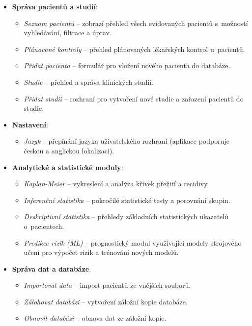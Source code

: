 \documentclass[12pt,a4paper]{article}
\begin{document}
\begin{itemize}
    \item \textbf{Správa pacientů a studií}:
    \begin{itemize}
        \item \textit{Seznam pacientů} -- zobrazí přehled všech evidovaných pacientů s~možností vyhledávání, filtrace a úprav.
        \item \textit{Plánované kontroly} -- přehled plánovaných lékařských kontrol u~pacientů.
        \item \textit{Přidat pacienta} -- formulář pro vložení nového pacienta do databáze.
        \item \textit{Studie} -- přehled a správa klinických studií.
        \item \textit{Přidat studii} -- rozhraní pro vytvoření nové studie a zařazení pacientů do studie.
    \end{itemize}
    
    \item \textbf{Nastavení}:
    \begin{itemize}
        \item \textit{Jazyk} -- přepínání jazyka uživatelského rozhraní (aplikace podporuje českou a anglickou lokalizaci).
    \end{itemize}

    \item \textbf{Analytické a statistické moduly}:
    \begin{itemize}
        \item \textit{Kaplan-Meier} -- vykreslení a analýza křivek přežití a recidivy.
        \item \textit{Inferenční statistika} -- pokročilé statistické testy a porovnání skupin.
        \item \textit{Deskriptivní statistika} -- přehledy základních statistických ukazatelů o~pacientech.
        \item \textit{Predikce rizik (ML)} -- prognostický modul využívající modely strojového učení pro výpočet rizik a trénování nových modelů.
    \end{itemize}

    \item \textbf{Správa dat a databáze}:
    \begin{itemize}
        \item \textit{Importovat data} -- import pacientů ze vnějších souborů.
        \item \textit{Zálohovat databázi} -- vytvoření záložní kopie databáze.
        \item \textit{Obnovit databázi} -- obnova dat ze záložní kopie.
    \end{itemize}
\end{itemize}
\end{document}

